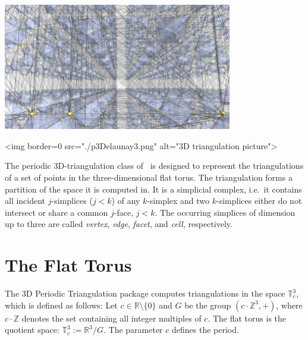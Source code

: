 %

\begin{ccTexOnly}
\begin{center}
\includegraphics[width=10cm]{Periodic_3_triangulation_3/p3Delaunay3}
\end{center}
\end{ccTexOnly}
\begin{ccHtmlOnly}
<img border=0 src="./p3Delaunay3.png" alt="3D triangulation picture">
\end{ccHtmlOnly}

The periodic 3D-triangulation class of \cgal\ is designed to
represent the triangulations of a set of points in the
three-dimensional flat torus. The triangulation forms a partition of
the space it is computed in. It is a simplicial complex, i.e.\ it
contains all incident $j$-simplices ($j<k$) of any $k$-simplex and two
$k$-simplices either do not intersect or share a common $j$-face,
$j<k$. The occurring simplices of dimension up to three are called
\emph{vertex}, \emph{edge}, \emph{facet}, and \emph{cell}, respectively.

\section{The Flat Torus\label{P3Triangulation3-sec-space}}
The 3D Periodic Triangulation package computes triangulations in the
space $\mathbb T_c^3$, which is defined as follows: Let $c\in\mathbb
R\setminus\{0\}$ and $G$ be the group $(c\cdot\mathbb Z^3, +)$, where
$c\cdot\mathbb Z$ denotes the set containing all integer multiples of
$c$. The flat torus is the quotient space: $\mathbb T_c^3:=\mathbb
R^3/G$. The parameter $c$ defines the period.

